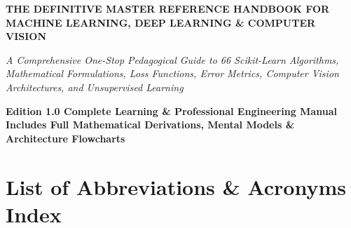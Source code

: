 \documentclass[
  10pt,
  letterpaper,
]{article}
\author{}
\date{}
\begin{document}
\hypersetup{pageanchor=false}
\begin{titlepage}
\centering
\vspace*{0.20\textheight}
{\color{HandbookBlue}\bfseries\fontsize{22}{27}\selectfont
THE DEFINITIVE MASTER REFERENCE HANDBOOK FOR MACHINE LEARNING, DEEP LEARNING \& COMPUTER VISION\par}

\vspace{1.5cm}
{\large\itshape
A Comprehensive One-Stop Pedagogical Guide to 66 Scikit-Learn Algorithms, Mathematical Formulations, Loss Functions, Error Metrics, Computer Vision Architectures, and Unsupervised Learning\par}

\vfill
{\color{HandbookBlue}\bfseries
Edition 1.0 \textbar{} Complete Learning \& Professional Engineering Manual\\[0.35em]
Includes Full Mathematical Derivations, Mental Models \& Architecture Flowcharts\par}
\vspace*{0.12\textheight}
\end{titlepage}
\hypersetup{pageanchor=true}

\tableofcontents
\hypertarget{list-of-abbreviations-acronyms-index}{%
\section{List of Abbreviations \& Acronyms Index}\label{list-of-abbreviations-acronyms-index}}
\end{document}
